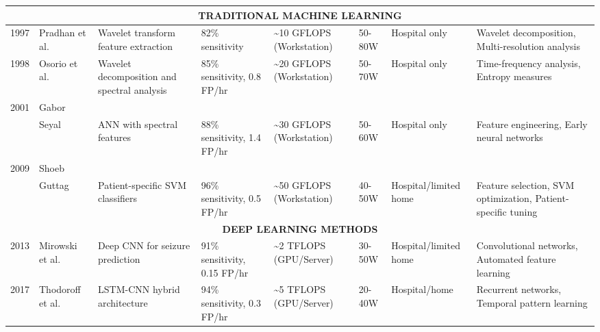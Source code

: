 \documentclass[pdflatex,sn-mathphys-num]{sn-jnl}%
\theoremstyle{thmstyleone}%
\theoremstyle{thmstyletwo}%
\theoremstyle{thmstylethree}%
\begin{document}
\begin{landscape}
\begin{longtable}{|p{1.2cm}|p{1.5cm}|p{2.5cm}|p{2.3cm}|p{2.5cm}|p{1.8cm}|p{2.2cm}|p{3cm}|}
\multicolumn{8}{|c|}{\textbf{TRADITIONAL MACHINE LEARNING}} \\
\hline
1997 & Pradhan et al.~\cite{pradhan1997} & Wavelet transform feature extraction & 82\% sensitivity & \textasciitilde10 GFLOPS (Workstation) & 50-80W & Hospital only & Wavelet decomposition, Multi-resolution analysis \\
\hline
1998 & Osorio et al.~\cite{Osorio1998} & Wavelet decomposition and spectral analysis & 85\% sensitivity, 0.8 FP/hr & \textasciitilde20 GFLOPS (Workstation) & 50-70W & Hospital only & Time-frequency analysis, Entropy measures \\
\hline
2001 & Gabor \\& Seyal~\cite{gabor2001} & ANN with spectral features & 88\% sensitivity, 1.4 FP/hr & \textasciitilde30 GFLOPS (Workstation) & 50-60W & Hospital only & Feature engineering, Early neural networks \\
\hline
2009 & Shoeb \\& Guttag~\cite{shoeb2009} & Patient-specific SVM classifiers & 96\% sensitivity, 0.5 FP/hr & \textasciitilde50 GFLOPS (Workstation) & 40-50W & Hospital/limited home & Feature selection, SVM optimization, Patient-specific tuning \\
\hline

\multicolumn{8}{|c|}{\textbf{DEEP LEARNING METHODS}} \\
\hline
2013 & Mirowski et al.~\cite{mirowski2013} & Deep CNN for seizure prediction & 91\% sensitivity, 0.15 FP/hr & \textasciitilde2 TFLOPS (GPU/Server) & 30-50W & Hospital/limited home & Convolutional networks, Automated feature learning \\
\hline
2017 & Thodoroff et al.~\cite{thodoroff2017} & LSTM-CNN hybrid architecture & 94\% sensitivity, 0.3 FP/hr & \textasciitilde5 TFLOPS (GPU/Server) & 20-40W & Hospital/home & Recurrent networks, Temporal pattern learning \\
\hline


\end{longtable}
\end{landscape}
\end{document}
